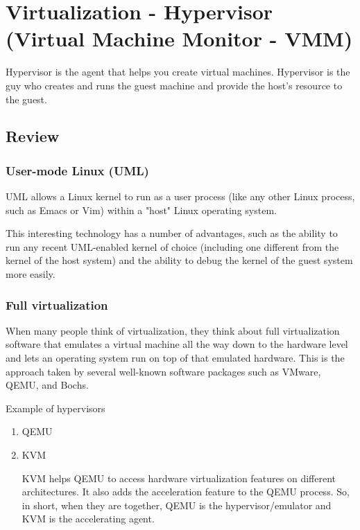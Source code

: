 \chapter{Virtualization - Hypervisor (Virtual Machine Monitor - VMM)}
\label{chap:Hypervisor}


Hypervisor is the agent that helps you create virtual machines.
Hypervisor is the guy who creates and runs the guest machine and provide the
host’s resource to the guest. 

\section{Review}

\subsection{User-mode Linux (UML)}

UML allows a Linux kernel to run as a user process (like any other Linux
process, such as Emacs or Vim) within a "host" Linux operating system.

This interesting technology has a number of advantages, such as the ability to
run any recent UML-enabled kernel of choice (including one different from the
kernel of the host system) and the ability to debug the kernel of the guest
system more easily.



\subsection{Full virtualization}

When many people think of virtualization, they think about full virtualization
software that emulates a virtual machine all the way down to the hardware level
and lets an operating system run on top of that emulated hardware. This is the
approach taken by several well-known software packages such as VMware, QEMU, and
Bochs.

Example of hypervisors
\begin{enumerate}
  \item QEMU 
  
  \item KVM 
  
  KVM helps QEMU to access hardware virtualization features on different
  architectures.
  It also adds the acceleration feature to the QEMU process. So, in short, when
  they are together, QEMU is the hypervisor/emulator and KVM is the accelerating
  agent.
  
\end{enumerate}

